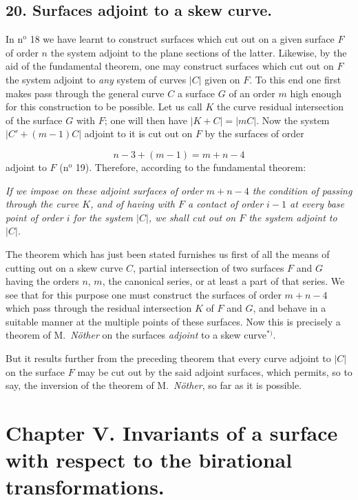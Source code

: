 \documentclass{article}
\begin{document}
\subsection*{20. Surfaces adjoint to a skew curve.}

In n${}^{\text{o}}$ 18 we have learnt to construct surfaces which cut out on a given surface $F$ of order $n$ the system adjoint to the plane sections of the latter. Likewise, by the aid of the fundamental theorem, one may construct surfaces which cut out on $F$ the system adjoint to \emph{any} system of curves $|C|$ given on $F$. To this end one first makes pass through the general curve $C$ a surface $G$ of an order $m$ high enough for this construction to be possible. Let us call $K$ the curve residual intersection of the surface $G$ with $F$; one will then have $|K+C| = |mC|$. Now the system $|C'+(m-1)C|$ adjoint to it is cut out on $F$ by the surfaces of order

\[ n-3+(m-1) = m+n-4 \]
adjoint to $F$ (n${}^{\text{o}}$ 19). Therefore, according to the fundamental theorem:

\emph{If we impose on these adjoint surfaces of order $m+n-4$ the condition of passing through the curve $K$, and of having with $F$ a contact of order $i-1$ at every base point of order $i$ for the system $|C|$, we shall cut out on $F$ the system adjoint to $|C|$.}

The theorem which has just been stated furnishes us first of all the means of cutting out on a skew curve $C$, partial intersection of two surfaces $F$ and $G$ having the orders $n$, $m$, the canonical series, or at least a part of that series. We see that for this purpose one must construct the surfaces of order $m+n-4$ which pass through the residual intersection $K$ of $F$ and $G$, and behave in a suitable manner at the multiple points of these surfaces. Now this is precisely a theorem of M.\ \emph{Nöther} on the surfaces \emph{adjoint} to a skew curve${}^{*)}$.

But it results further from the preceding theorem that every curve adjoint to $|C|$ on the surface $F$ may be cut out by the said adjoint surfaces, which permits, so to say, the inversion of the theorem of M.\ \emph{Nöther}, so far as it is possible.

\section*{Chapter V. Invariants of a surface with respect to the birational transformations.}
\end{document}
